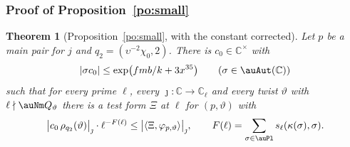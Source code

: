 \documentclass[10pt]{amsart}
\newtheorem{theorem}{Theorem}[section]
\theoremstyle{definition}
\theoremstyle{remark}
\newcommand{\C}{\mathbb C}
\begin{document}
\subsubsection{Proof of Proposition~\ref{po:small}}\label{psu:ss-small}

\begin{theorem}[Proposition~\ref{po:small}, with the constant corrected]\label{psu:small}
Let $p$ be a main pair for $j$ and $q_2=(\upsilon^{-2}\chi_0,2)$. There is $c_0\in\C^\times$ with
\[
|\sigma c_0|\le\exp\bigl(fmb/k+3x^{35}\bigr)\qquad(\sigma\in\auAut(\C))
\]
such that for every prime $\ell$, every $\jmath\colon\C\to\C_\ell$ and every twist $\vartheta$ with
$\ell\nmid\auNm Q_\vartheta$ there is a test form $\Xi$ at $\ell$ for $(p,\vartheta)$ with
\[
\bigl|c_0\,\rho_{q_2}(\vartheta)\bigr|_\jmath\cdot\ell^{-F(\ell)}\le\bigl|\langle\Xi,\varphi_{p,\vartheta}
\rangle\bigr|_\jmath,\qquad F(\ell)=\sum_{\sigma\in\auPl}s_\ell(\kappa(\sigma),\sigma).
\]
\end{theorem}
\end{document}
